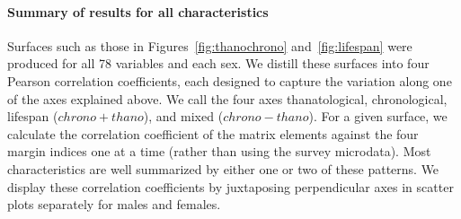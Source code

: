 \documentclass[11pt,oneside]{article} %
\begin{document}
\paragraph{Summary of results for all characteristics}
Surfaces such as those in Figures~\ref{fig:thanochrono} and~\ref{fig:lifespan}
were produced for all 78 variables and each sex. We distill these surfaces into
four Pearson correlation coefficients, each designed to capture the variation along one of the axes explained above. We call the four axes
thanatological, chronological, lifespan ($chrono+thano$), and mixed
($chrono-thano$). For a given surface, we calculate the correlation
coefficient of the matrix elements against the four margin indices one at a
time (rather than using the survey microdata).
Most characteristics are well summarized by either one or two of these
patterns.
We display these correlation coefficients by juxtaposing perpendicular axes in
scatter plots separately for males and females.
\end{document}
